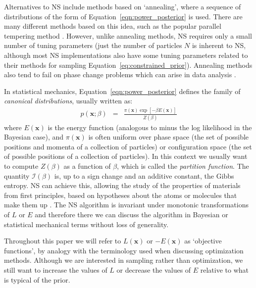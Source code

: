 \documentclass[journal,article,accept,moreauthors,pdftex,12pt,a4paper]{mdpi}
\newcommand{\xx}{\boldsymbol{x}}
\begin{document}
Alternatives to NS include methods based on `annealing', where a sequence of
distributions of the form of Equation~\ref{eqn:power_posterior} is used.
There are many different methods based on this idea, such as the popular
parallel tempering method \citep{pt, gregory}.
However, unlike annealing methods, NS requires only a small number of
tuning parameters (just the number of particles $N$ is inherent to NS, although
most NS implementations also have some tuning parameters related to their
methods for sampling Equation~\ref{eq:constrained_prior}). Annealing methods
also tend to fail on phase change problems \citep{skilling} which can arise
in data analysis \citep{rjobject, exoplanet}.

In statistical mechanics, Equation~\ref{eqn:power_posterior} defines the
family of {\it canonical distributions}, usually written as:
\begin{eqnarray}
p(\xx; \beta) &=& \frac{\pi(\xx)\exp[-\beta E(\xx)]}{Z(\beta)}
\end{eqnarray}
where $E(\xx)$ is the energy function (analogous to minus the log likelihood
in the Bayesian case), and $\pi(\xx)$ is often uniform over
phase space (the set of possible positions and momenta of a collection of
particles) or configuration space (the set of possible positions of a collection
of particles). In this context we usually want to
compute $Z(\beta)$ as a function of $\beta$, which is called the
{\it partition function}. The quantity $\mathcal{I}(\beta)$ is, up to a sign
change and an additive constant, the Gibbs entropy.
NS can achieve this, allowing the study of
the properties of materials from first principles, based on hypotheses about
the atoms or molecules that make them up \citep[e.g.][]{2009arXiv0906.3544P,
2014PhRvE..89b2302P, 2015arXiv150303404B}. The NS algorithm is invariant under
monotonic transformations of $L$ or $E$ and therefore there we can discuss the
algorithm in Bayesian or statistical mechanical terms without loss of
generality.

Throughout this paper we will refer to $L(\xx)$ or
$-E(\xx)$ as `objective functions',
by analogy with the terminology used when
discussing optimization methods. Although we are interested in sampling rather
than optimization, we still want to increase the values of $L$ or decrease
the values of $E$ relative to what is typical of the prior.
\end{document}

